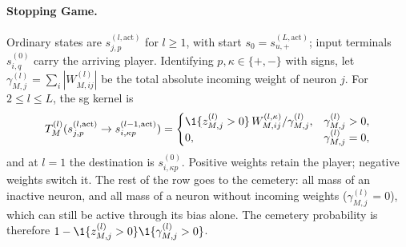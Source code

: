 \paragraph{Stopping Game.}
Ordinary states are $s^{(l,\mathrm{act})}_{j,p}$ for $l\ge1$, with start $s_0=s^{(L,\mathrm{act})}_{u,+}$; input terminals $s^{(0)}_{i,q}$ carry the arriving player. Identifying $p,\kappa\in\{+,-\}$ with signs, let $\gamma^{(l)}_{M,j}=\sum_i|W^{(l)}_{M,ij}|$ be the total absolute incoming weight of neuron $j$. For $2\le l\le L$, the \ac{sg} kernel is
\begin{equation}\label{ptnb:eq:adf-T}
 T_M^{(l)}(s^{(l,\mathrm{act})}_{j,p}\to s^{(l-1,\mathrm{act})}_{i,\kappa p})
 =\begin{cases}
 \1\{z_{M,j}^{(l)}>0\}\,W^{(l,\kappa)}_{M,ij}/\gamma^{(l)}_{M,j}, & \gamma^{(l)}_{M,j}>0,\\
 0, & \gamma^{(l)}_{M,j}=0,
 \end{cases}
\end{equation}
and at $l=1$ the destination is $s^{(0)}_{i,\kappa p}$. Positive weights retain the player; negative weights switch it. The rest of the row goes to the cemetery: all mass of an inactive neuron, and all mass of a neuron without incoming weights ($\gamma^{(l)}_{M,j}=0$), which can still be active through its bias alone. The cemetery probability is therefore $1-\1\{z_{M,j}^{(l)}>0\}\1\{\gamma^{(l)}_{M,j}>0\}$.

